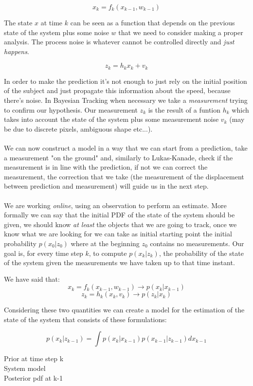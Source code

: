 \[
    x_k = f_k(x_{k-1}, w_{k-1})
\]

The state $x$ at time $k$ can be seen as a function that depends on the previous state of the system plus some noise $w$ that we need to consider making a proper analysis. The process noise is whatever cannot be controlled directly and \textit{just happens}.

\[
    z_k = h_k x_k + v_k
\]

In order to make the prediction it's not enough to just rely on the initial position of the subject and just propagate this information about the speed, because there's noise. In Bayesian Tracking when necessary we take a \textit{measurement} trying to confirm our hypothesis. Our measurement $z_k$ is the result of a funtion $h_k$ which takes into account the state of the system plus some measurement noise $v_k$ (may be due to discrete pixels, ambiguous shape etc...).
\\
\\
We can now construct a model in a way that we can start from a prediction, take a measurement "on the ground" and, similarly to Lukas-Kanade, check if the measurement is in line with the prediction, if not we can correct the measurement, the correction that we take (the measurement of the displacement between prediction and measurement) will guide us in the next step.
\\
\\
We are working \textit{online}, using an observation to perform an estimate. More formally we can say that the initial PDF of the state of the system should be given, we should know \textit{at least} the objects that we are going to track, once we know what we are looking for we can take as initial starting point the initial probability $p(x_0|z_0)$ where at the beginning $z_0$ contains no measurements. Our goal is,  for every time step $k$, to compute $p(x_k|z_k)$, the probability of the state of the system given the measurements we have taken up to that time instant.


We have said that:
\[
    x_k = f_k(x_{k-1}, w_{k-1}) \rightarrow p(x_k|x_{k-1})
\]
\[
    z_k = h_k(x_k, v_k) \rightarrow p(z_k|x_k)
\]

Considering these two quantities we can create a model for the estimation of the state of the system that consists of these formulations:

\[
    p(x_k|z_{k-1}) = \int p(x_k|x_{k-1})p(x_{k-1}|z_{k-1})dx_{k-1}
\]

\begin{multicols}{3}
    Prior at time step k\\
    System model\\
    Posterior pdf at k-1
\end{multicols}

